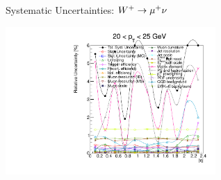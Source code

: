 \begin{frame}{Systematic Uncertainties: $W^+ \rightarrow \mu^+ \nu$}
 \begin{center}
   \includegraphics[width=0.6\textwidth]{dates/20121219/figures/xsec/POS/Wmn_Unc_2d_Slice_1.pdf}
 \end{center}
\end{frame}

